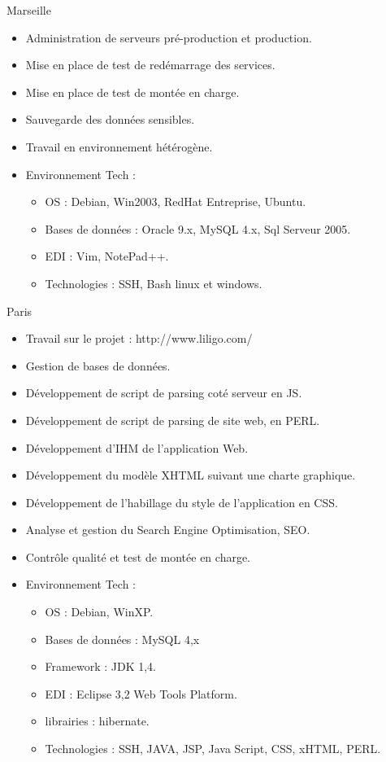 \documentclass[10pt,a4paper,sans]{moderncv}
\begin{document}
{Marseille}{
    \begin{itemize}%
        \item Administration de serveurs pré-production et production.
        \item Mise en place de test de redémarrage des services.
        \item Mise en place de test de montée en charge.
        \item Sauvegarde des données sensibles.
        \item Travail en environnement hétérogène.
        \item Environnement Tech :
            \begin{itemize}%
                \item OS : Debian, Win2003, RedHat Entreprise, Ubuntu.
                \item Bases de données : Oracle 9.x, MySQL 4.x, Sql Serveur 2005.
                \item EDI : Vim, NotePad++.
                \item Technologies : SSH, Bash linux et windows.
            \end{itemize}
\end{itemize}}

{Paris}{
    \begin{itemize}%
        \item Travail sur le projet : http://www.liligo.com/
        \item Gestion de bases de données.
        \item Développement de script de parsing coté serveur en JS.
        \item Développement de script de parsing de site web, en PERL.
        \item Développement d'IHM de l'application Web.
        \item Développement du modèle XHTML suivant une charte graphique.
        \item Développement de l’habillage du style de l'application en CSS.
        \item Analyse et gestion du Search Engine Optimisation, SEO.
        \item Contrôle qualité et test de montée en charge.
        \item Environnement Tech :
            \begin{itemize}%
                \item OS : Debian, WinXP.
                \item Bases de données : MySQL 4,x
                \item Framework : JDK 1,4.
                \item EDI : Eclipse 3,2 Web Tools Platform.
                \item librairies : hibernate.
                \item Technologies : SSH, JAVA, JSP, Java Script, CSS, xHTML, PERL.
            \end{itemize}
\end{itemize}}
\end{document}
